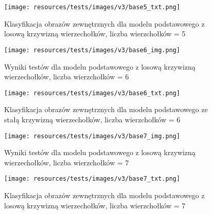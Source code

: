 \begin{figure}[ht]
	\centering
	\texttt{[image: resources/tests/images/v3/base5\_txt.png]}
	\caption{Klasyfikacja obrazów zewnętrznych dla modelu podstawowego z losową krzywizną wierzechołków, liczba wierzchołków = 5}
	\label{Fig:tests-base-2}
\end{figure}
\FloatBarrier

\begin{figure}[ht]
	\centering
	\texttt{[image: resources/tests/images/v3/base6\_img.png]}
	\caption{Wyniki testów dla modelu podstawowego z losową krzywizną wierzechołków, liczba wierzchołków = 6}
	\label{Fig:tests-base-1}
\end{figure}
\FloatBarrier

\begin{figure}[ht]
	\centering
	\texttt{[image: resources/tests/images/v3/base6\_txt.png]}
	\caption{Klasyfikacja obrazów zewnętrznych dla modelu podstawowego ze stałą krzywizną wierzechołków, liczba wierzchołków = 6}
	\label{Fig:tests-base-2}
\end{figure}
\FloatBarrier

\begin{figure}[ht]
	\centering
	\texttt{[image: resources/tests/images/v3/base7\_img.png]}
	\caption{Wyniki testów dla modelu podstawowego z losową krzywizną wierzechołków, liczba wierzchołków = 7}
	\label{Fig:tests-base-1}
\end{figure}
\FloatBarrier

\begin{figure}[ht]
	\centering
	\texttt{[image: resources/tests/images/v3/base7\_txt.png]}
	\caption{Klasyfikacja obrazów zewnętrznych dla modelu podstawowego z losową krzywizną wierzechołków, liczba wierzchołków = 7}
	\label{Fig:tests-base-2}
\end{figure}
\FloatBarrier